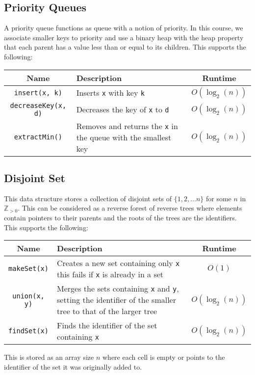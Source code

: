 \subsection{Priority Queues}

A priority queue functions as queue with a notion of priority.
In this course, we associate smaller keys to priority and use a 
binary heap with the heap property that each parent has a value 
less than or equal to its children. This supports the following:
\begin{center}
  \begin{tabular}{ || c | p{7.5cm} | c || }
    \hline
    Name & Description & Runtime \\
    \hline
    \texttt{insert(x, k)} & Inserts \texttt{x} with key \texttt{k}
    & $O(\log_2(n))$ \\
    \hline
    \texttt{decreaseKey(x, d)} & Decreases the key of \texttt{x} to \texttt{d}
    & $O(\log_2(n))$ \\
    \hline
    \texttt{extractMin()} & Removes and returns the \texttt{x} in the queue
    with the smallest key & $O(\log_2(n))$ \\
    \hline
  \end{tabular}
\end{center}

\subsection{Disjoint Set}

This data structure stores a collection of disjoint sets of 
$\{1, 2, \ldots n\}$ for some $n$ in $\mathbb{Z}_{> 0}$.
This can be considered as a reverse forest of reverse
trees where elements contain pointers to their parents and the
roots of the trees are the identifiers.
This supports the following:
\begin{center}
  \begin{tabular}{ || c | p{7.5cm} | c || }
    \hline
    Name & Description & Runtime \\
    \hline
    \texttt{makeSet(x)} & Creates a new set containing only \texttt{x}
    this fails if \texttt{x} is already in a set
    & $O(1)$ \\
    \hline
    \texttt{union(x, y)} & Merges the sets containing 
    \texttt{x} and \texttt{y}, setting the identifier
    of the smaller tree to that of the larger tree
    & $O(\log_2(n))$ \\
    \hline
    \texttt{findSet(x)} & Finds the identifier of the set containing
    \texttt{x}
    & $O(\log_2(n))$ \\
    \hline
  \end{tabular}
\end{center} This is stored as an array size $n$ where each cell
is empty or points to the identifier of the set it was originally
added to.


